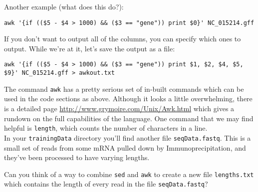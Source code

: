 \begin{steps}
Another example (what does this do?): \\
\begin{lstlisting}
awk '{if (($5 - $4 > 1000) && ($3 == "gene")) print $0}' NC_015214.gff 
\end{lstlisting}
If you don't want to output all of the columns, you can specify which ones to output.  
While we're at it, let's save the output as a file: \\
\begin{lstlisting}
awk '{if (($5 - $4 > 1000) && ($3 == "gene")) print $1, $2, $4, $5, $9}' NC_015214.gff > awkout.txt
\end{lstlisting}
\end{steps}

\begin{advanced}
The command \texttt{awk} has a pretty serious set of in-built commands which can be used in the code sections as above.
Although it looks a little overwhelming, there is a detailed page \url{http://www.grymoire.com/Unix/Awk.html} which gives a rundown on the full capabilities of the language.
One command that we may find helpful is \texttt{length}, which counts the number of characters in a line. \\

In your \texttt{trainingData} directory you'll find another file \texttt{seqData.fastq}.
This is a small set of reads from some mRNA pulled down by Immunoprecipitation, and they've been processed to have varying lengths.

\begin{questions}
Can you think of a way to combine \texttt{sed} and \texttt{awk} to create a new file \texttt{lengths.txt} which contains the length of every read in the file \texttt{seqData.fastq}?
\end{questions}
\begin{answer}}
\texttt{sed -n `2\~{}4p' seqData.fastq | awk `\{print length(\$1)\}' > lengths.txt}
\end{answer}
\end{advanced}